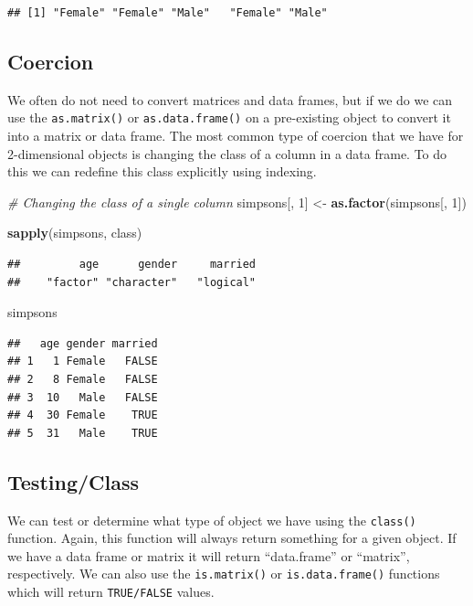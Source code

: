 \documentclass[
]{book}
\newenvironment{Shaded}{\begin{snugshade}}{\end{snugshade}}
\newcommand{\CommentTok}[1]{\textcolor[rgb]{0.56,0.35,0.01}{\textit{#1}}}
\newcommand{\DecValTok}[1]{\textcolor[rgb]{0.00,0.00,0.81}{#1}}
\newcommand{\KeywordTok}[1]{\textcolor[rgb]{0.13,0.29,0.53}{\textbf{#1}}}
\newcommand{\NormalTok}[1]{#1}
\newcommand{\StringTok}[1]{\textcolor[rgb]{0.31,0.60,0.02}{#1}}
\begin{document}
\begin{verbatim}
## [1] "Female" "Female" "Male"   "Female" "Male"
\end{verbatim}

\hypertarget{coercion-3}{%
\subsection{Coercion}\label{coercion-3}}

We often do not need to convert matrices and data frames, but if we do we can use the \texttt{as.matrix()} or \texttt{as.data.frame()} on a pre-existing object to convert it into a matrix or data frame. The most common type of coercion that we have for 2-dimensional objects is changing the class of a column in a data frame. To do this we can redefine this class explicitly using indexing.

\begin{Shaded}
\begin{Highlighting}[]
\CommentTok{# Changing the class of a single column}
\NormalTok{simpsons[, }\DecValTok{1}\NormalTok{] <-}\StringTok{ }\KeywordTok{as.factor}\NormalTok{(simpsons[, }\DecValTok{1}\NormalTok{])}

\KeywordTok{sapply}\NormalTok{(simpsons, class)}
\end{Highlighting}
\end{Shaded}

\begin{verbatim}
##         age      gender     married 
##    "factor" "character"   "logical"
\end{verbatim}

\begin{Shaded}
\begin{Highlighting}[]
\NormalTok{simpsons}
\end{Highlighting}
\end{Shaded}

\begin{verbatim}
##   age gender married
## 1   1 Female   FALSE
## 2   8 Female   FALSE
## 3  10   Male   FALSE
## 4  30 Female    TRUE
## 5  31   Male    TRUE
\end{verbatim}

\hypertarget{testingclass-2}{%
\subsection{Testing/Class}\label{testingclass-2}}

We can test or determine what type of object we have using the \texttt{class()} function. Again, this function will always return something for a given object. If we have a data frame or matrix it will return ``data.frame'' or ``matrix'', respectively. We can also use the \texttt{is.matrix()} or \texttt{is.data.frame()} functions which will return \texttt{TRUE/FALSE} values.
\end{document}
